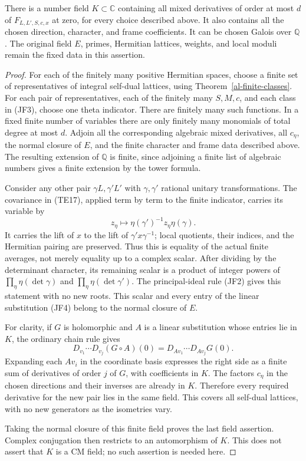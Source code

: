 \begin{proposition}\label{jcf-common-field}
There is a number field $K\subset\mathbb C$ containing all
mixed derivatives of order at most $d$ of
$F_{L,L',S,c,x}$ at zero, for every choice described above.
It also contains all the chosen direction, character, and
frame coefficients. It can be chosen Galois over $\mathbb Q$.
The original field $E$, primes, Hermitian lattices, weights,
and local moduli remain the fixed data in this assertion.
\end{proposition}
\begin{proof}
For each of the finitely many positive Hermitian spaces,
choose a finite set of representatives of integral self-dual
lattices, using Theorem~\ref{al-finite-classes}. For each
pair of representatives, each of the finitely many $S,M,c$,
and each class in (JF3), choose one theta indicator. There
are finitely many such functions. In a fixed finite number
of variables there are only finitely many monomials of total
degree at most $d$. Adjoin all the corresponding algebraic
mixed derivatives, all $c_\eta$, the normal closure of $E$,
and the finite character and frame data described above.
The resulting extension of $\mathbb Q$ is finite, since
adjoining a finite list of algebraic numbers gives a finite
extension by the tower formula.

Consider any other pair $\gamma L,\gamma'L'$ with
$\gamma,\gamma'$ rational unitary transformations. The
covariance in (TE17), applied term by term to the finite
indicator, carries its variable by
\[
                z_\eta\longmapsto
                             \eta(\gamma')^{-1}z_\eta\eta(\gamma).
                                                               \tag{JF4}
\]
It carries the lift of $x$ to the lift of $\gamma'x\gamma^{-1}$;
local quotients, their indices, and the Hermitian pairing
are preserved. Thus this is equality of the actual finite
averages, not merely equality up to a complex scalar.
After dividing by the determinant character, its remaining
scalar is a product of integer powers of
$\prod_\eta\eta(\det\gamma)$ and
$\prod_\eta\eta(\det\gamma')$. The principal-ideal rule
(JF2) gives this statement with no new roots. This scalar
and every entry of the linear substitution (JF4) belong to
the normal closure of $E$.

For clarity, if $G$ is holomorphic and $A$ is a linear
substitution whose entries lie in $K$, the ordinary chain
rule gives
\[
 D_{v_1}\cdots D_{v_j}(G\circ A)(0)
                    =D_{Av_1}\cdots D_{Av_j}G(0).        \tag{JF5}
\]
Expanding each $Av_i$ in the coordinate basis expresses the
right side as a finite sum of derivatives of order $j$ of
$G$, with coefficients in $K$. The factors $c_\eta$ in the
chosen directions and their inverses are already in $K$.
Therefore every required derivative for the new pair lies
in the same field. This covers all self-dual lattices, with
no new generators as the isometries vary.

Taking the normal closure of this finite field proves the
last field assertion. Complex conjugation then restricts
to an automorphism of $K$. This does not assert that $K$
is a CM field; no such assertion is needed here.
\end{proof}

